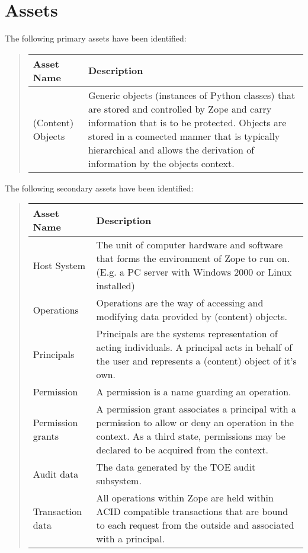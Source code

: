 \documentclass[12pt,english]{scrbook}
\begin{document}
\section{Assets}

The following primary assets have been identified:
\begin{quote}

\begin{longtable}[c]{|l|l|}
\hline
\textbf{
Asset Name
} & \textbf{
Description
} \\
\hline
\endhead

(Content) Objects
 & 
Generic objects (instances of Python classes) that
are stored and controlled by Zope and carry
information that is to be protected. Objects are
stored in a connected manner that is typically
hierarchical and allows the derivation of
information by the objects context.
 \\
\hline
\end{longtable}
\end{quote}

The following secondary assets have been identified:
\begin{quote}

\begin{longtable}[c]{|l|l|}
\hline
\textbf{
Asset Name
} & \textbf{
Description
} \\
\hline
\endhead

Host System
 & 
The unit of computer hardware and software that
forms the environment of Zope to run on. (E.g.
a PC server with Windows 2000 or Linux installed)
 \\
\hline

Operations
 & 
Operations are the way of accessing and modifying
data provided by (content) objects.
 \\
\hline

Principals
 & 
Principals are the systems representation of acting
individuals. A principal acts in behalf of the user
and represents a (content) object of it's own.
 \\
\hline

Permission
 & 
A permission is a name guarding an operation.
 \\
\hline

Permission grants
 & 
A permission grant associates a principal with a
permission to allow or deny an operation in the context.
As a third state, permissions may be declared to
be acquired from the context.
 \\
\hline

Audit data
 & 
The data generated by the TOE audit subsystem.
 \\
\hline

Transaction data
 & 
All operations within Zope are held within ACID
compatible transactions that are bound to each
request from the outside and associated with a
principal.
 \\
\hline
\end{longtable}
\end{quote}
\end{document}
